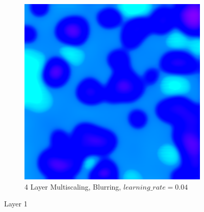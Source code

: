 \begin{figure}
\begin{subfigure}[t]{0.31\textwidth}
    \end{subfigure}
    \hfill
    \begin{subfigure}[t]{0.31\textwidth}
        \captionsetup{justification=centering}
        \centering
        \includegraphics[width=.7\linewidth]{figuras/feat_vis/experiments/initial/l1/random_image_pl4_lr4e-2_layer0.png}
        \caption{4 Layer Multiscaling, Blurring, \(learning\_rate = 0.04\)}
    \end{subfigure}

    \caption{Layer 1}
    \label{fig:layer_1}
\end{figure}

